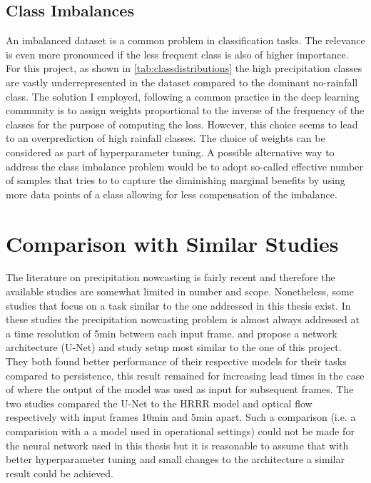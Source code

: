\subsection{Class Imbalances}
An imbalanced dataset is a common problem in classification tasks. The relevance is even more pronounced if the less frequent class is also of higher importance. For this project, as shown in \cref{tab:classdistributions} the high precipitation classes are vastly underrepresented in the dataset compared to the dominant no-rainfall class. The solution I employed, following a common practice in the deep learning community is to assign weights proportional to the inverse of the frequency of the classes for the purpose of computing the loss. However, this choice seems to lead to an overprediction of high rainfall classes. The choice of weights can be considered as part of hyperparameter tuning. A possible alternative way to address the class imbalance problem would be to adopt so-called effective number of samples \citet{Cui2019Class-BalancedSamples} that tries to to capture the diminishing marginal benefits by using more
data points of a class allowing for less compensation of the imbalance.


\section{Comparison with Similar Studies}

The literature on precipitation nowcasting is fairly recent and therefore the available studies are somewhat limited in number and scope. Nonetheless, some studies that focus on a task similar to the one addressed in this thesis exist. In these studies the precipitation nowcasting problem is almost always addressed at a time resolution of 5min between each input frame. \citet{Agrawal2019MachineImages} and \citet{Ayzel2020RainNetNowcasting} propose a network architecture (U-Net) and study setup most similar to the one of this project. They both found better performance of their respective models for their tasks compared to persistence, this result remained for increasing lead times in the case of \citet{Ayzel2020RainNetNowcasting} where the output of the model was used as input for subsequent frames. The two studies compared the U-Net to the HRRR model and optical flow respectively with input frames 10min and 5min apart. Such a comparison (i.e. a comparision with a a model used in operational settings) could not be made for the neural network used in this thesis but it is reasonable to assume that with better hyperparameter tuning and small changes to the architecture a similar result could be achieved.

